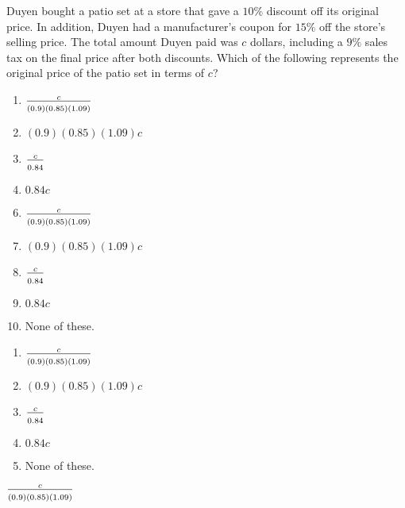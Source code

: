  
Duyen bought a patio set at a store that gave a $10\%$ discount off its original price.  In addition, Duyen had a manufacturer's coupon for $15\%$ off the store's selling price.  The total amount Duyen paid was $c$ dollars, including a $9\%$ sales tax on the final price after both discounts.  Which of the following represents the original price of the patio set in terms of $c$?  


\ifsat
	\begin{enumerate}[label=\Alph*)]
		\item $\frac{c}{\rule{0mm}{3mm}(0.9)(0.85)(1.09)} $ %
		\item $(0.9)(0.85)(1.09)c $ 
		\item $\frac{c}{\rule{0mm}{3mm}0.84} $ 
		\item $0.84c $
	\end{enumerate}
\else
\fi

\ifacteven
	\begin{enumerate}[label=\textbf{\Alph*.},itemsep=\fill,align=left]
		\setcounter{enumii}{5}
		\item $\frac{c}{\rule{0mm}{3mm}(0.9)(0.85)(1.09)} $ %
		\item $(0.9)(0.85)(1.09)c $ 
		\item $\frac{c}{\rule{0mm}{3mm}0.84} $ 
		\addtocounter{enumii}{1}
		\item $0.84c $
		\item None of these. 
	\end{enumerate}
\else
\fi

\ifactodd
	\begin{enumerate}[label=\textbf{\Alph*.},itemsep=\fill,align=left]
		\item $\frac{c}{\rule{0mm}{3mm}(0.9)(0.85)(1.09)} $ %
		\item $(0.9)(0.85)(1.09)c $ 
		\item $\frac{c}{\rule{0mm}{3mm}0.84} $ 
		\item $0.84c $
		\item None of these. 
	\end{enumerate}
\else
\fi

\ifgridin
 $\frac{c}{\rule{0mm}{3mm}(0.9)(0.85)(1.09)} $ %
		
\else
\fi


